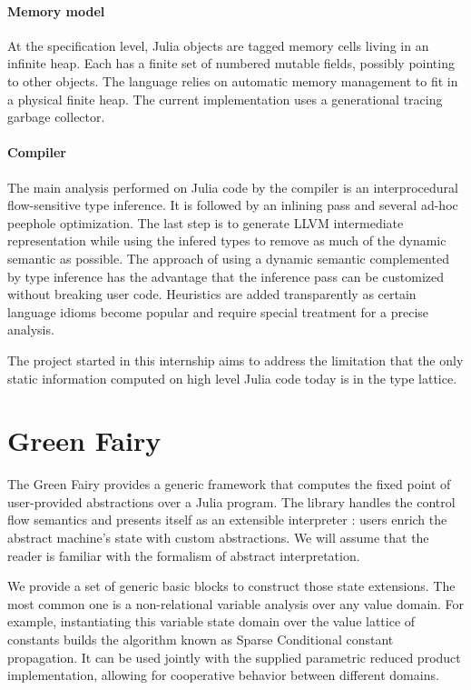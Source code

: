 \documentclass[11pt]{article}
\begin{document}
\paragraph{Memory model} At the specification level, Julia objects are tagged memory cells living in an infinite heap. Each has a finite set of numbered mutable fields, possibly pointing to other objects. The language relies on automatic memory management to fit in a physical finite heap.
The current implementation uses a generational tracing garbage collector. %

\paragraph{Compiler} The main analysis performed on Julia code by the compiler is an interprocedural flow-sensitive type inference. It is followed by an inlining pass and several ad-hoc peephole optimization. The last step is to generate LLVM intermediate representation while using the infered types to remove as much of the dynamic semantic as possible.
The approach of using a dynamic semantic complemented by type inference has the advantage that the inference pass can be customized without breaking user code.
Heuristics are added transparently as certain language idioms become popular and require special treatment for a precise analysis.

The project started in this internship aims to address the limitation that the only static information computed on high level Julia code today is in the type lattice.

\section*{Green Fairy}

The Green Fairy provides a generic framework that computes the fixed point of user-provided abstractions over a Julia program.
The library handles the control flow semantics and presents itself as an extensible interpreter : users enrich the abstract machine's state with custom abstractions.
We will assume that the reader is familiar with the formalism of abstract interpretation\cite{absint-cousot}.

We provide a set of generic basic blocks to construct those state extensions.
The most common one is a non-relational variable analysis over any value domain.
For example, instantiating this variable state domain over the value lattice of constants builds the algorithm known as Sparse Conditional constant propagation\cite{sparsecp}.
It can be used jointly with the supplied parametric reduced product\cite{redprod} implementation, allowing for cooperative behavior between different domains.
\end{document}
